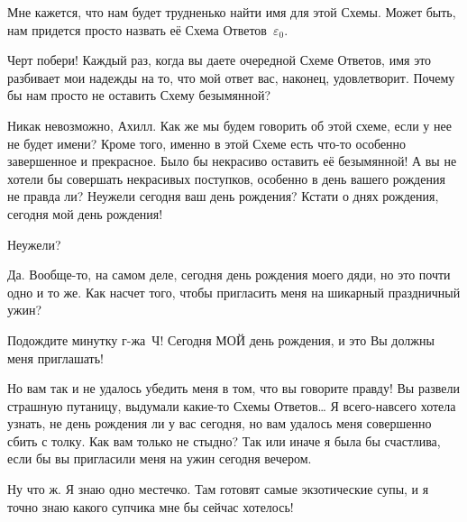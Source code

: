 \documentclass[../main.tex]{subfiles}
\begin{document}
\begin{dialogue}
 Мне кажется, что нам будет трудненько найти имя для этой Схемы. Может быть, нам придется просто назвать её Схема Ответов~$\varepsilon_0$.

 Черт побери! Каждый раз, когда вы даете очередной Схеме Ответов, имя это разбивает мои надежды на то, что мой ответ вас, наконец, удовлетворит. Почему бы нам просто не оставить Схему безымянной?

 Никак невозможно, Ахилл. Как же мы будем говорить об этой схеме, если у нее не будет имени? Кроме того, именно в этой Схеме есть что-то особенно завершенное и прекрасное. Было бы некрасиво оставить её безымянной! А вы не хотели бы совершать некрасивых поступков, особенно в день вашего рождения не правда ли? Неужели сегодня ваш день рождения? Кстати о днях рождения, сегодня мой день рождения!

 Неужели?

 Да. Вообще-то, на самом деле, сегодня день рождения моего дяди, но это почти одно и то же. Как насчет того, чтобы пригласить меня на шикарный праздничный ужин?

 Подождите минутку г-жа~Ч! Сегодня МОЙ день рождения, и это Вы должны меня приглашать!

 Но вам так и не удалось убедить меня в том, что вы говорите правду! Вы развели страшную путаницу, выдумали какие-то Схемы Ответов\ldots{} Я всего-навсего хотела узнать, не день рождения ли у вас сегодня, но вам удалось меня совершенно сбить с толку. Как вам только не стыдно? Так или иначе я была бы счастлива, если бы вы пригласили меня на ужин сегодня вечером.

 Ну что ж. Я знаю одно местечко. Там готовят самые экзотические супы, и я точно знаю какого супчика мне бы сейчас хотелось!

\end{dialogue}
\end{document}
